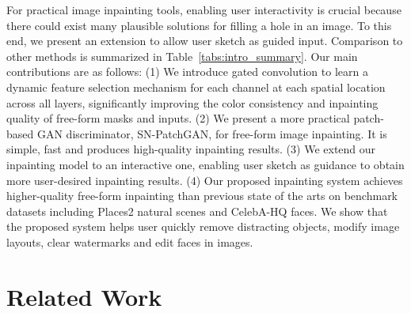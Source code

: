 \documentclass[10pt,twocolumn,letterpaper]{article}
\begin{document}
 
For practical image inpainting tools, enabling user interactivity is crucial because there could exist many plausible solutions for filling a hole in an image. To this end, we present an extension to allow user sketch as guided input. Comparison to other methods is summarized in Table~\ref{tabs:intro_summary}. Our main contributions are as follows: (1) We introduce gated convolution to learn a dynamic feature selection mechanism for each channel at each spatial location across all layers, significantly improving the color consistency and inpainting quality of free-form masks and inputs. (2) We present a more practical patch-based GAN discriminator, SN-PatchGAN, for free-form image inpainting. It is simple, fast and produces high-quality inpainting results. (3) We extend our inpainting model to an interactive one, enabling user sketch as guidance to obtain more user-desired inpainting results. (4) Our proposed inpainting system achieves higher-quality free-form inpainting than previous state of the arts on benchmark datasets including Places2 natural scenes and CelebA-HQ faces. We show that the proposed system helps user quickly remove distracting objects, modify image layouts, clear watermarks and edit faces in images.

 
\section{Related Work}
\end{document}

